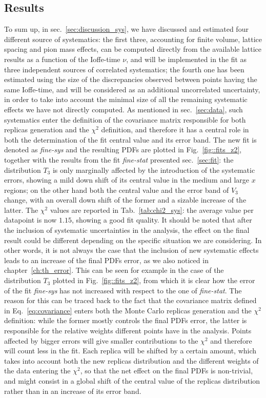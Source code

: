 \subsection{Results}
\label{sec:res}
%
To sum up, in sec.~\ref{sec:discussion_sys}, we have discussed and estimated four different source of systematics: 
the first three, accounting for finite volume, lattice spacing and pion mass effects, can be computed directly from the available 
lattice results as a function of the Ioffe-time $\nu$, and will be implemented in the fit 
as three independent sources of correlated systematics; the fourth one has been estimated using
the size of the discrepancies observed between points having the same Ioffe-time, and will be considered
as an additional uncorrelated uncertainty, in order to take into account the minimal size of all the remaining systematic effects
we have not directly computed. 
%
As mentioned in sec.~\ref{sec:data}, such systematics enter the definition of the covariance matrix responsible 
for both replicas generation and the $\chi^2$ definition, and therefore it has a central role in both
the determination of the fit central value and its error band.
The new fit is denoted as \textit{fine-sys} and the resulting PDFs are plotted in Fig.~\ref{fig::fits_z2}, 
together with the results from  the fit \textit{fine-stat} presented sec.~\ref{sec:fit}:
the distribution $T_3$ is only marginally affected by the introduction of the systematic errors,
showing a mild down shift of its central value in the medium and large $x$ regions; on the other hand 
both the central value and the error band of $V_3$ change, with an overall down shift of the former and 
a sizable increase of the latter. 
The $\chi^2$ values are reported in Tab.~\ref{tab:chi2_sys}: the average value per datapoint is now $1.15$, 
showing a good fit quality.
%
It should be noted that after the inclusion of systematic uncertainties in the analysis, the effect
on the final result could be different depending on the specific situation we are considering.
In other words, it is not always the case that the inclusion of new systematic effects leads to an increase 
of the final PDFs error, as we also noticed in chapter~\ref{ch:th_error}. This can be seen for example in the case of the distribution $T_3$ plotted in Fig.~\ref{fig::fits_z2},
from which it is clear how the error of the fit \textit{fine-sys} has not increased with respect to the one of
\textit{fine-stat}. The reason for this can be traced back to the fact that the covariance matrix 
defined in Eq.~\eqref{eq:covariance} enters both the Monte Carlo replicas generation and the $\chi^2$ definition:
while the former mostly controls the final PDFs error, 
the latter is responsible for the relative weights different points have in the analysis.
Points affected by bigger errors will give smaller contributions to the $\chi^2$ and therefore 
will count less in the fit. 
Each replica will be shifted by a certain amount, 
which takes into account both the new replicas distribution and the different weights of the data entering the
$\chi^2$, so that the net effect on the final PDFs is non-trivial, and might consist in a global shift
of the central value of the replicas distribution rather than in an increase of its error band.


